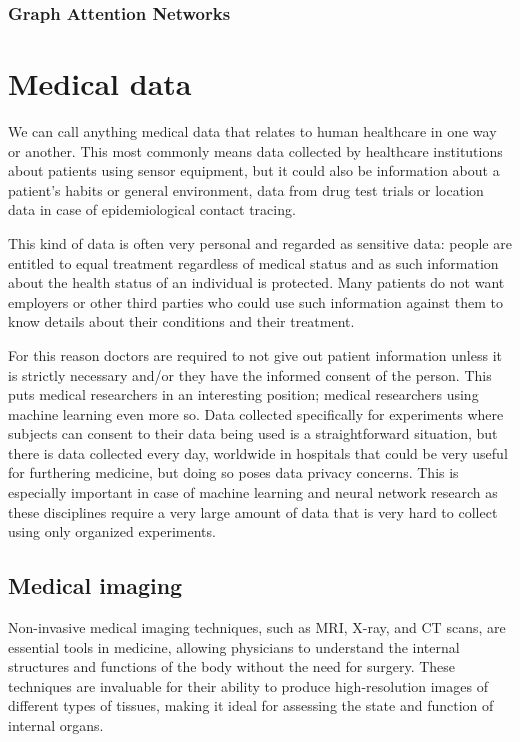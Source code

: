 		\subsubsection{Graph Attention Networks}
	
\section{Medical data}

	We can call anything medical data that relates to human healthcare in one way or another. This most commonly means data collected by healthcare institutions about patients using sensor equipment, but it could also be information about a patient's habits or general environment, data from drug test trials or location data in case of epidemiological contact tracing. 
	
	This kind of data is often very personal and regarded as sensitive data: people are entitled to equal treatment regardless of medical status and as such information about the health status of an individual is protected. Many patients do not want employers or other third parties who could use such information against them to know details about their conditions and their treatment.
	
	
	For this reason doctors are required to not give out patient information unless it is strictly necessary and/or they have the informed consent of the person. This puts medical researchers in an interesting position; medical researchers using machine learning even more so. Data collected specifically for experiments where subjects can consent to their data being used is a straightforward situation, but there is data collected every day, worldwide in hospitals that could be very useful for furthering medicine, but doing so poses data privacy concerns. This is especially important in case of machine learning and neural network research as these disciplines require a very large amount of data that is very hard to collect using only organized experiments.
	
	 

	\subsection{Medical imaging}
	
	Non-invasive medical imaging techniques, such as MRI, X-ray, and CT scans, are essential tools in medicine, allowing physicians to understand the internal structures and functions of the body without the need for surgery. These techniques are invaluable for their ability to produce high-resolution images of different types of tissues, making it ideal for assessing the state and function of internal organs. 
	
